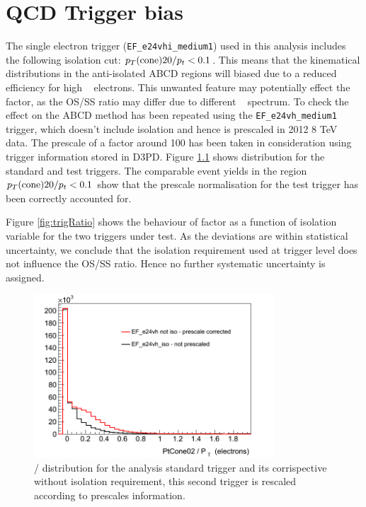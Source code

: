 \chapter{QCD Trigger bias}
\label{appendix:qcd}

The single electron trigger (\verb=EF_e24vhi_medium1=) used in this analysis includes the following isolation cut: $p_{T}(\mathrm{cone})20 / p_{t} < 0.1$.
This means that the kinematical distributions in the anti-isolated ABCD regions will biased due to a reduced efficiency for high \pt~ electrons. This unwanted feature may potentially effect the \rqcd factor, as the OS/SS ratio may differ due to different \PT~ spectrum. 
To check the effect on \rqcd the ABCD method has been repeated using the \verb=EF_e24vh_medium1= trigger, which doesn't include isolation and hence is prescaled in 2012 8 TeV data. The prescale of a factor around 100 has been taken in consideration using trigger information stored in D3PD. Figure \ref{fig:prescale} shows 
\ptcone distribution for the standard and test triggers. The comparable event yields in the region $p_{T}(\mathrm{cone})20 / p_{t} < 0.1$ show that the prescale normalisation for the test trigger has been correctly accounted for.

Figure \ref{fig:trigRatio} shows the behaviour of \rqcd factor as a function of isolation variable for the two triggers under test.
As the deviations are within statistical uncertainty,  we conclude that the isolation requirement used at trigger level does not influence
the OS/SS ratio. Hence no further systematic uncertainty is assigned.



\begin{figure}[t]
\begin{center}
\includegraphics[width=9cm]{figure/appendix/trigger_comp.png}
\end{center}
\caption{\ptcone / \PT distribution for the analysis standard trigger and  its corrispective without isolation requirement,
this second trigger is rescaled according to prescales information.} 
\label{fig:prescale}
\end{figure}

